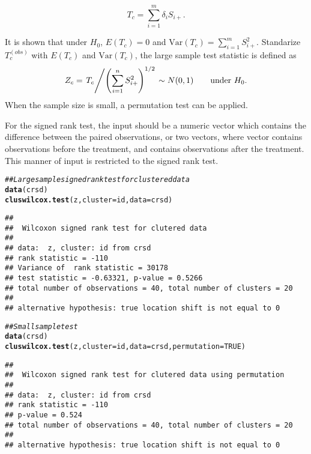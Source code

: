 \documentclass[nojss]{jss}\usepackage[]{graphicx}\usepackage[]{color}
\makeatletter
\newcommand{\hlnum}[1]{\textcolor[rgb]{0.686,0.059,0.569}{#1}}%
\newcommand{\hlcom}[1]{\textcolor[rgb]{0.678,0.584,0.686}{\textit{#1}}}%
\newcommand{\hlstd}[1]{\textcolor[rgb]{0.345,0.345,0.345}{#1}}%
\newcommand{\hlkwc}[1]{\textcolor[rgb]{0.333,0.667,0.333}{#1}}%
\newcommand{\hlkwd}[1]{\textcolor[rgb]{0.737,0.353,0.396}{\textbf{#1}}}%
\newenvironment{kframe}{%
 \def\at@end@of@kframe{}%
 \ifinner\ifhmode%
  \def\at@end@of@kframe{\end{minipage}}%
  \begin{minipage}{\columnwidth}%
 \fi\fi%
 \def\FrameCommand##1{\hskip\@totalleftmargin \hskip-\fboxsep
 \colorbox{shadecolor}{##1}\hskip-\fboxsep
     \hskip-\linewidth \hskip-\@totalleftmargin \hskip\columnwidth}%
 \MakeFramed {\advance\hsize-\width
   \@totalleftmargin\z@ \linewidth\hsize
   \@setminipage}}%
 {\par\unskip\endMakeFramed%
 \at@end@of@kframe}
\newenvironment{knitrout}{}{} %
\makeatother
\begin{document}
\begin{equation} \label{eq:tc}
T_c = \sum_{i=1}^m\delta_iS_{i+}.
\end{equation}

It is shown that under $H_0$, $E(T_c) = 0$
and $\text{Var}(T_c) = \sum^m_{i=1}S^2_{i+}$.
Standarize $T_{c}^{(obs)}$ with $E(T_c)$ and
$\text{Var}(T_c)$,
the large sample test statistic is defined as
\begin{equation}
Z_c = \left. T_c \middle/ \left(\sum_{i=1}^nS^2_{i+}\right)^{1/2}\right. \sim N(0, 1)\qquad \text{under } H_0.
\end{equation}
When the sample size is small, a permutation
test can be applied.


For the signed rank test, the input should be a numeric
vector which contains the difference between the paired
observations, or two vectors, where vector
 contains observations before the treatment,
and  contains observations after the treatment.
This manner of input is restricted to the signed rank
test.

\begin{knitrout}
\color{fgcolor}\begin{kframe}
\begin{alltt}
\hlcom{## Large sample signed rank test for clustered data}
\hlkwd{data}\hlstd{(crsd)}
\hlkwd{cluswilcox.test}\hlstd{(z,} \hlkwc{cluster} \hlstd{= id,} \hlkwc{data} \hlstd{= crsd)}
\end{alltt}
\begin{verbatim}
## 
## 	Wilcoxon signed rank test for clutered data
## 
## data:  z, cluster: id from crsd
## rank statistic = -110
## Variance of  rank statistic = 30178
## test statistic = -0.63321, p-value = 0.5266
## total number of observations = 40, total number of clusters = 20
## 
## alternative hypothesis: true location shift is not equal to 0
\end{verbatim}
\begin{alltt}
\hlcom{## Small sample test}
\hlkwd{data}\hlstd{(crsd)}
\hlkwd{cluswilcox.test}\hlstd{(z,} \hlkwc{cluster} \hlstd{= id,} \hlkwc{data} \hlstd{= crsd,} \hlkwc{permutation} \hlstd{=} \hlnum{TRUE}\hlstd{)}
\end{alltt}
\begin{verbatim}
## 
## 	Wilcoxon signed rank test for clutered data using permutation
## 
## data:  z, cluster: id from crsd
## rank statistic = -110
## p-value = 0.524
## total number of observations = 40, total number of clusters = 20
## 
## alternative hypothesis: true location shift is not equal to 0
\end{verbatim}
\end{kframe}
\end{knitrout}
\end{document}
